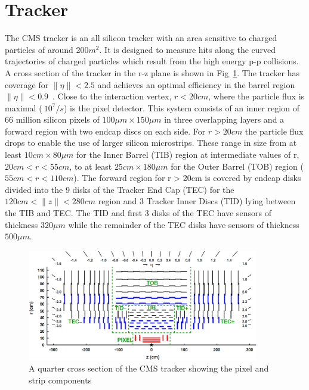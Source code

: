\section{Tracker}
The CMS tracker is an all silicon tracker with an area sensitive to charged particles of around 200$m^2$. It is designed to measure hits along the
curved trajectories of charged particles which result from the high energy p-p collisions. A cross section of the tracker in the r-z plane is shown in Fig~\ref{TRACKER_SLICE}.
The tracker has coverage for $\|\eta\| < 2.5$ and achieves an optimal efficiency in the barrel region $\|\eta\| < 0.9$~\cite{tracker_performance,tracker_tdr}. 
Close to the interaction vertex, $r < 20cm$, where the particle flux is maximal ($~10^7/s$) is the pixel detector. This system consists of an inner region of 66 million silicon 
pixels of $100\mu m \times 150\mu m$ in three overlapping layers and a forward region with two endcap discs on each side.
For $r > 20cm$ the particle flux drops to enable the use of larger silicon microstrips. These range in size from at least $10cm \times 80\mu m$ for the Inner Barrel (TIB) region 
at intermediate values of r, $20cm < r < 55cm$, to at least $25cm \times 180\mu m$ for the Outer Barrel (TOB) region ($55cm < r < 110cm$). The forward region
for r > 20cm is covered by endcap disks divided into the 9 disks of the Tracker End Cap (TEC) for the $120cm < \|z\| < 280 cm$ region and 
3 Tracker Inner Discs (TID) lying between the TIB and TEC. The TID and first 3 disks of the TEC have sensors of thickness $320\mu m$ while the remainder of the TEC disks
have sensors of thickness $500\mu m$\cite{tracker_tdr}.

\begin{figure}
\centering
    \includegraphics[width=0.9\textwidth]{./Figures/detector/CMS2Dtracker}
  \caption{A quarter cross section of the CMS tracker showing the pixel and strip components~\cite{tracker_fig}}
  \label{TRACKER_SLICE}
\end{figure}

